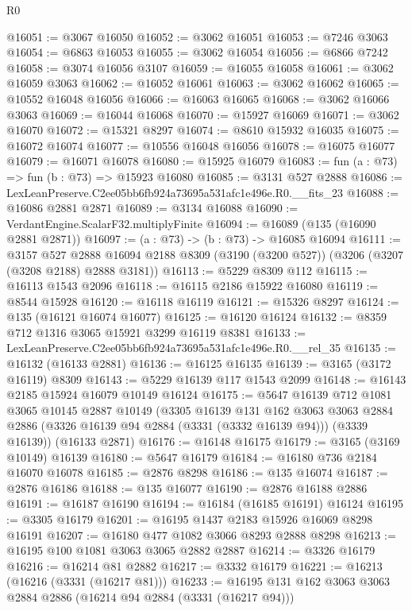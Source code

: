 \begin{lexlean}{R0}
\begin{coremodule}
@16051 := @3067 @16050
@16052 := @3062 @16051
@16053 := @7246 @3063
@16054 := @6863 @16053
@16055 := @3062 @16054
@16056 := @6866 @7242
@16058 := @3074 @16056 @3107
@16059 := @16055 @16058
@16061 := @3062 @16059 @3063
@16062 := @16052 @16061
@16063 := @3062 @16062
@16065 := @10552 @16048 @16056
@16066 := @16063 @16065
@16068 := @3062 @16066 @3063
@16069 := @16044 @16068
@16070 := @15927 @16069
@16071 := @3062 @16070
@16072 := @15321 @8297
@16074 := @8610 @15932 @16035
@16075 := @16072 @16074
@16077 := @10556 @16048 @16056
@16078 := @16075 @16077
@16079 := @16071 @16078
@16080 := @15925 @16079
@16083 := fun (a : @73) => fun (b : @73) => @15923 @16080
@16085 := @3131 @527 @2888
@16086 := LexLeanPreserve.C2ee05bb6fb924a73695a531afc1e496e.R0.__fits_23
@16088 := @16086 @2881 @2871
@16089 := @3134 @16088
@16090 := VerdantEngine.ScalarF32.multiplyFinite
@16094 := @16089 (@135 (@16090 @2881 @2871))
@16097 := (a : @73) -> (b : @73) -> @16085 @16094
@16111 := @3157
    @527
    @2888
    @16094
    @2188
    @8309
    (@3190 (@3200 @527))
    (@3206 (@3207 (@3208 @2188) @2888 @3181))
@16113 := @5229 @8309 @112
@16115 := @16113 @1543 @2096
@16118 := @16115 @2186 @15922 @16080
@16119 := @8544 @15928
@16120 := @16118 @16119
@16121 := @15326 @8297
@16124 := @135 (@16121 @16074 @16077)
@16125 := @16120 @16124
@16132 := @8359 @712 @1316 @3065 @15921 @3299 @16119 @8381
@16133 := LexLeanPreserve.C2ee05bb6fb924a73695a531afc1e496e.R0.__rel_35
@16135 := @16132 (@16133 @2881)
@16136 := @16125 @16135
@16139 := @3165 (@3172 @16119) @8309
@16143 := @5229 @16139 @117 @1543 @2099
@16148 := @16143 @2185 @15924 @16079 @10149 @16124
@16175 := @5647
    @16139
    @712
    @1081
    @3065
    @10145
    @2887
    @10149
    (@3305
      @16139
      @131
      @162
      @3063
      @3063
      @2884
      @2886
      (@3326 @16139 @94 @2884 (@3331 (@3332 @16139 @94)))
      (@3339 @16139))
    (@16133 @2871)
@16176 := @16148 @16175
@16179 := @3165 (@3169 @10149) @16139
@16180 := @5647 @16179
@16184 := @16180 @736 @2184 @16070 @16078
@16185 := @2876 @8298
@16186 := @135 @16074
@16187 := @2876 @16186
@16188 := @135 @16077
@16190 := @2876 @16188 @2886
@16191 := @16187 @16190
@16194 := @16184 (@16185 @16191) @16124
@16195 := @3305 @16179
@16201 := @16195 @1437 @2183 @15926 @16069 @8298 @16191
@16207 := @16180 @477 @1082 @3066 @8293 @2888 @8298
@16213 := @16195 @100 @1081 @3063 @3065 @2882 @2887
@16214 := @3326 @16179
@16216 := @16214 @81 @2882
@16217 := @3332 @16179
@16221 := @16213 (@16216 (@3331 (@16217 @81)))
@16233 := @16195 @131 @162 @3063 @3063 @2884 @2886 (@16214 @94 @2884 (@3331 (@16217 @94)))

\end{coremodule}
\end{lexlean}
